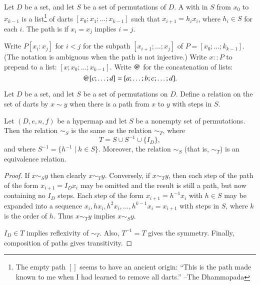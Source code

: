 \begin{definition}[path] 
Let $D$ be a set, and let $S$ be a set of permutations of $D$.
A  with  in $S$
from $x_0$ to $x_{k-1}$ is a list\footnote{The empty path $[]$ seems
to have an ancient origin: ``This is the path made known to me
when I had learned to remove all darts.'' --The Dhammapada} of
darts $[x_0;x_1;\ldots;x_{k-1}]$ such that $x_{i+1} = h_i x_i$,
where $h_i \in S$  for each $i$.    The
path is  if $x_i=x_j$ implies $i=j$. 
\end{definition}

\begin{notation}[$::$,~$\opat$]
Write $P[x_i:x_j]$ for $i<j$ for the subpath $[x_{i+1};\ldots;x_j]$ of
$P=[x_0;\ldots;k_{k-1}]$.  (The notation is ambiguous when the path is
not injective.)  Write $x::P$ to prepend to a list:
$[x;x_0;\ldots;x_{k-1}]$.  Write $\opat$ for the concatenation of
lists:
\begin{displaymath}
[a;\ldots;b] \opat [c;\ldots;d]  = [a;\ldots;b;c;\ldots;d].
\end{displaymath}
\end{notation}
%
%
%


\begin{definition}[$\sim_S$]
Let $D$ be a set, and let $S$ be a 
set of permutations on $D$.
Define a relation on the set of darts by $x\sim y$ when there is a
path from $x$ to $y$ with steps in $S$.
\end{definition}

\begin{lemma}\label{lemma:er} 
Let $(D,e,n,f)$ be a hypermap and let $S$ be a nonempty set of permutations.
Then the relation $\sim_S$ is the same as the relation $\sim_T$, where
\begin{displaymath}
T = S \cup S^{-1} \cup \{I_D\},
\end{displaymath}
and where $S^{-1} = \{h^{-1} \mid h \in S\}$.
Moreover,  the relation $\sim_S$ (that is, $\sim_T$) is an equivalence relation.  
%
\end{lemma}

\begin{proof} If $x\sim_S y$ then clearly $x\sim_T y$.  Conversely,
if $x\sim_T y$, then each step of the path of the form $x_{i+1} = I_D x_{i}$ may be omitted and the result is still a path, but now containing no $I_D$ steps.
Each step of the form $x_{i+1} = h^{-1} x_i$ with $h\in S$ may be expanded into
a sequence  $x_i,h x_{i}, h^2 x_{i},\ldots,h^{k-1} x_{i} = x_{i+1}$ with steps in 
$S$, where $k$ is the order of $h$.  Thus $x\sim_T y$ implies $x\sim_S y$.

$I_D\in T$ implies reflexivity of $\sim_T$.  Also, $T^{-1} = T$ gives the symmetry.  Finally, composition of paths gives transitivity.
\end{proof}

